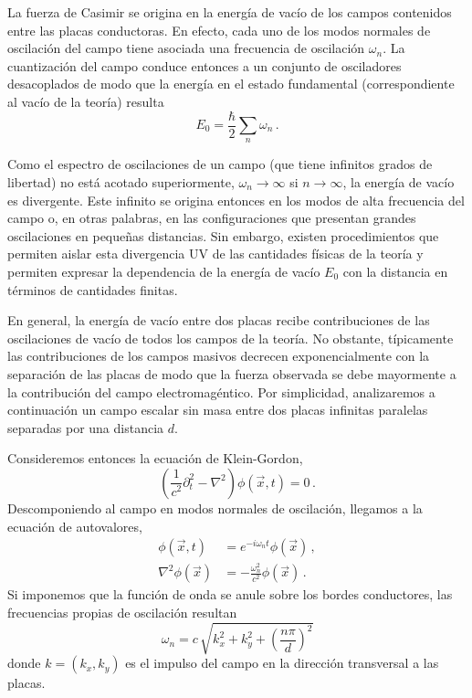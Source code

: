 {\red La fuerza de Casimir se origina en la energía de vacío de los campos contenidos entre las placas conductoras. En efecto, cada uno de los modos normales de oscilación del campo tiene asociada una frecuencia de oscilación $\omega_n$. La cuantización del campo conduce entonces a un conjunto de osciladores desacoplados de modo que la energía en el estado fundamental (correspondiente al vacío de la teoría) resulta}
\begin{equation}
E _0 = \frac{\hbar}{2} \sum _n \omega _n\,.
\end{equation}
{\red Como el espectro de oscilaciones de un campo (que tiene infinitos grados de libertad) no está acotado superiormente, $\omega_n\to\infty$ si $n\to\infty$, la energía de vacío es divergente. Este infinito se origina entonces en los modos de alta frecuencia del campo o, en otras palabras, en las configuraciones que presentan grandes oscilaciones en pequeñas distancias. Sin embargo, existen procedimientos que permiten aislar esta divergencia UV de las cantidades físicas de la teoría y permiten expresar la dependencia de la energía de vacío $E_0$ con la distancia en términos de cantidades finitas.

En general, la energía de vacío entre dos placas recibe contribuciones de las oscilaciones de vacío de todos los campos de la teoría. No obstante, típicamente las contribuciones de los campos masivos decrecen exponencialmente con la separación de las placas de modo que la fuerza observada se debe mayormente a la contribución del campo electromagéntico. Por simplicidad, analizaremos a continuación un campo escalar sin masa entre dos placas infinitas paralelas separadas por una distancia $d$.}

Consideremos entonces la ecuación de Klein-Gordon,
\begin{equation}
\left( \frac{1}{c^2} \partial _t ^2 - \nabla  ^2  \right) \phi (\vec{x} ,t) = 0 \,.
\end{equation}
Descomponiendo al campo en modos normales de oscilación, llegamos a la ecuación de autovalores,
\begin{align}
\phi ( \vec{x},t) &= e ^{-i \omega _n t} \phi ( \vec{x}) \,,\\
\nabla ^2 \phi ( \vec{x}) &= - \frac{\omega _n ^2}{c ^2} \phi ( \vec{x})\,.
\end{align}
Si imponemos que la función de onda se anule sobre los bordes conductores, las frecuencias propias de oscilación resultan
\begin{equation}
\omega _n = c\, \sqrt{ k _x ^2 + k _y ^2 + \left( \frac{n \pi}{d} \right) ^2 }
\end{equation}
{\red donde $k=(k_x,k_y)$ es el impulso del campo en la dirección transversal a las placas.}

